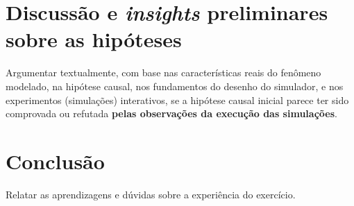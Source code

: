 \section{Discussão e \textit{insights} preliminares sobre as hipóteses}

Argumentar textualmente, com base nas características reais do fenômeno modelado, na hipótese causal, nos fundamentos do desenho do simulador, e nos experimentos (simulações) interativos, se a hipótese causal inicial parece ter sido comprovada ou refutada \textbf{pelas observações da execução das simulações}.

\section{Conclusão}

Relatar as aprendizagens e dúvidas sobre a experiência do exercício.
